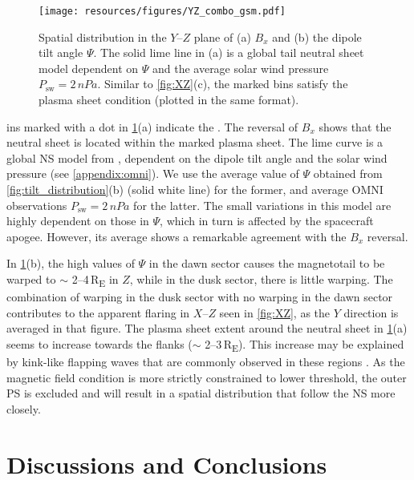 \documentclass[draft]{agujournal2019}
\begin{document}
\begin{figure}
\centering
\noindent\texttt{[image: resources/figures/YZ\_combo\_gsm.pdf]}
\caption{
Spatial distribution in the $Y$--$Z$ plane of (a) $B_x$ and (b) the dipole tilt angle $\Psi$. The solid lime line in (a) is a global tail neutral sheet model \cite{Xiao2016} dependent on $\Psi$ and the average solar wind pressure $P_\text{sw}=2\,\si{nPa}$. Similar to \cref{fig:XZ}(c), the marked bins satisfy the plasma sheet condition  (plotted in the same format).
}
\label{fig:YZ}
\end{figure}

ins marked with a dot in \cref{fig:YZ}(a) indicate the . The reversal of $B_x$ shows that the neutral sheet is located within the marked plasma sheet. The lime curve is a global NS model from , dependent on the dipole tilt angle and the solar wind pressure (see \ref{appendix:omni}). We use the average value of $\Psi$ obtained from \cref{fig:tilt_distribution}(b) (solid white line) for the former, and average OMNI observations ${P_\text{sw}=2\,\si{nPa}}$ for the latter. The small variations in this model are highly dependent on those in $\Psi$, which in turn is affected by the spacecraft apogee. However, its average shows a remarkable agreement with the $B_x$ reversal. 

In \cref{fig:YZ}(b), the high values of $\Psi$ in the dawn sector causes the magnetotail to be warped to $\sim$ 2--4\,\si{R_E} in $Z$, while in the dusk sector, there is little warping. The combination of warping in the dusk sector with no warping in the dawn sector contributes to the apparent flaring in $X$--$Z$ seen in \cref{fig:XZ}, as the $Y$ direction is averaged in that figure. The plasma sheet extent around the neutral sheet in \cref{fig:YZ}(a) seems to increase towards the flanks ($\sim$ 2--3\,\si{R_E}). This increase may be explained by kink-like flapping waves that are commonly observed in these regions \cite{Gao2018}. As the magnetic field condition is more strictly constrained to lower threshold, the outer PS is excluded and will result in a spatial distribution that follow the NS more closely.

\section{Discussions and Conclusions}\label{sec:conclude}
\end{document}
